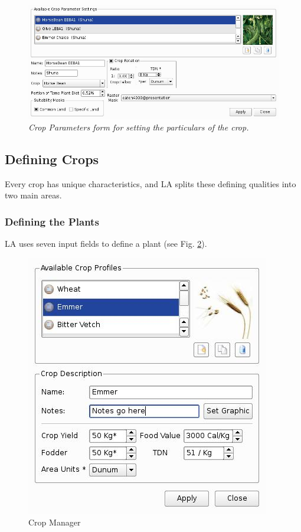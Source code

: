    \begin{figure}[htbp] %
      \includegraphics[scale=.28]{./images/cropParameters.jpg}
      \caption[Crop Parameters]{\label{fig:cropParameters}\textit{Crop
        Parameters form for setting the particulars of the crop.}}
    \end{figure}

\subsection{Defining Crops}Every crop has unique
characteristics, and LA splits these defining qualities into two
main areas.
  \subsubsection{Defining the Plants}LA uses seven input fields to define a
plant (see Fig.
  \ref{fig:cropManager}).

   \begin{figure}[htbp]
     \includegraphics[scale=.6]{./images/cropManager.jpg}
      \caption{\label{fig:cropManager}Crop Manager}
    \end{figure}

